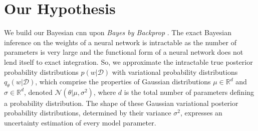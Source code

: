 \section{Our Hypothesis}
\newline We build our Bayesian \ac{cnn} upon \textit{Bayes by Backprop} \cite{graves2011practical,blundell2015weight}. The exact Bayesian inference on the weights of a neural network is intractable as the number of parameters is very large and the functional form of a neural network does not lend itself to exact integration. So, we approximate the intractable true posterior probability distributions $p(w|\mathcal{D})$ with variational probability distributions $q_{\theta}(w|\mathcal{D})$, which comprise the properties of Gaussian distributions $\mu \in \mathbb{R}^d$ and $\sigma \in \mathbb{R}^d$, denoted $\mathcal{N}(\theta|\mu, \sigma^2)$, where $d$ is the total number of parameters defining a probability distribution. The shape of these Gaussian variational posterior probability distributions, determined by their variance $\sigma^2$, expresses an uncertainty estimation of every model parameter. \\ \\



